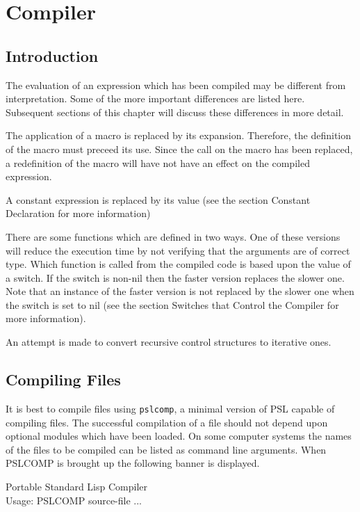 
\chapter*{Compiler}


\section{Introduction}

  The evaluation of an expression which has been compiled may be
different  from interpretation. Some of the more important
differences are listed here. Subsequent  sections  of  this
chapter will discuss these differences in more detail.

  The  application  of  a  macro  is  replaced by its expansion.
Therefore, the definition of the macro  must  preceed  its  use.
Since the call on the macro has been replaced, a redefinition of
the  macro  will  have  not  have  an  effect on the compiled
expression.

  A constant expression  is  replaced  by  its value (see  the
section Constant Declaration for more information)

  There are some functions which are defined in two ways. One of
these  versions  will reduce the execution time by not verifying
that the arguments are of  correct  type.  Which function is
called  from  the  compiled  code  is  based upon the value of a
switch.  If the  switch  is  non-nil  then  the  faster  version
replaces  the  slower  one.  Note that an instance of the faster
version is not replaced by the slower one when the switch is set
to nil (see the section Switches that Control the  Compiler  for
more information).

  An  attempt is made to convert recursive control structures to
iterative ones.

\section{Compiling Files}

It is best to compile files using {\tt pslcomp}, a minimal version
of PSL capable of compiling files. The successful compilation of
a  file  should not depend upon optional modules which have been
loaded.  On some computer systems the names of the files  to  be
compiled  can  be listed as command line arguments. When PSLCOMP
is brought up the following banner is displayed.

Portable Standard Lisp Compiler\\
Usage: PSLCOMP source-file ...

